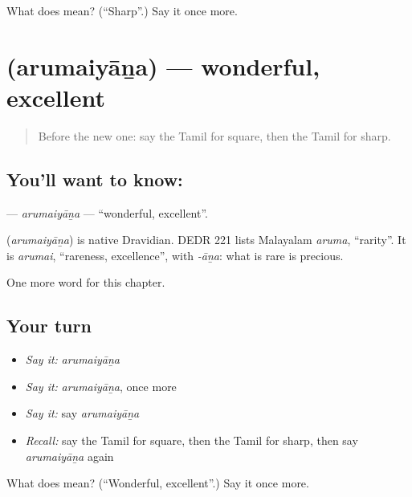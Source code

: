 \begin{tcolorbox}[breakable,colback=teal!4,colframe=teal!35!black,title={Before you move on}]
What does  mean? (\textquotedblleft{}Sharp\textquotedblright{}.) Say it once more.
\end{tcolorbox}
\section[\texorpdfstring{\ta{அருமையான} (arumaiyāṉa)}{அருமையான (arumaiyāṉa)}]{ (arumaiyāṉa) — wonderful, excellent}

\label{lesson:TA-C240-arumaiyana}



\begin{quote}
Before the new one: say the Tamil for square, then the Tamil for sharp.
\end{quote}

\subsection*{You'll want to know: }
\textbf{} — \emph{arumaiyāṉa} — \textquotedblleft{}wonderful, excellent\textquotedblright{}.

\begin{cousinweb}
\textbf{} (\emph{arumaiyāṉa}) is native Dravidian. DEDR 221 lists Malayalam \emph{aruma}, \textquotedblleft{}rarity\textquotedblright{}. It is \emph{arumai}, \textquotedblleft{}rareness, excellence\textquotedblright{}, with \emph{-āṉa}: what is rare is precious.
\end{cousinweb}

\begin{grammarlens}[title={What you've built}]
One more word for this chapter.
\end{grammarlens}

\subsection*{Your turn}
\begin{itemize}
\raggedright
  \item \emph{Say it:} \emph{arumaiyāṉa}
  \item \emph{Say it:} \emph{arumaiyāṉa}, once more
  \item \emph{Say it:} say \emph{arumaiyāṉa}
  \item \emph{Recall:} say the Tamil for square, then the Tamil for sharp, then say \emph{arumaiyāṉa} again
\end{itemize}

\begin{tcolorbox}[breakable,colback=teal!4,colframe=teal!35!black,title={Before you move on}]
What does  mean? (\textquotedblleft{}Wonderful, excellent\textquotedblright{}.) Say it once more.
\end{tcolorbox}
